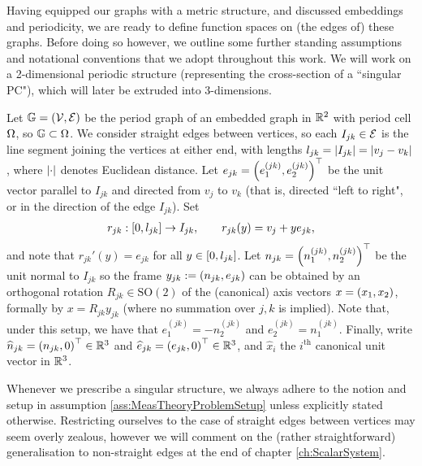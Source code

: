 Having equipped our graphs with a metric structure, and discussed embeddings and periodicity, we are ready to define function spaces on (the edges of) these graphs.
Before doing so however, we outline some further standing assumptions and notational conventions that we adopt throughout this work.
We will work on a 2-dimensional periodic structure (representing the cross-section of a ``singular PC"), which will later be extruded into 3-dimensions.
\begin{assumption} \label{ass:MeasTheoryProblemSetup}
	Let $\mathbb{G}=\left( \mathcal{V},\mathcal{E} \right)$ be the period graph of an embedded graph in $\mathbb{R}^2$ with period cell $\Omega$, so $\mathbb{G}\subset\Omega$.
	We consider straight edges between vertices, so each $I_{jk}\in \mathcal{E}$ is the line segment joining the vertices at either end, with lengths $l_{jk} = \left\lvert I_{jk} \right\rvert = \left\lvert v_j-v_k \right\rvert$, where $\left\lvert \cdot \right\rvert$ denotes Euclidean distance.
	Let $e_{jk} = \left( e_1^{(jk)}, e_2^{(jk)} \right)^\top$ be the unit vector parallel to $I_{jk}$ and directed from $v_j$ to $v_k$ (that is, directed ``left to right", or in the direction of the edge $I_{jk}$).
	Set
	\begin{align} \label{eq:EdgeParameterisation}
		r_{jk}:\left[ 0, l_{jk} \right] \rightarrow I_{jk},
		\qquad
		r_{jk}(y) = v_j + ye_{jk},
	\end{align}
	and note that $r_{jk}'(y) = e_{jk}$ for all $y\in\left[ 0, l_{jk} \right]$.
	Let $n_{jk} = \left( n_1^{(jk)}, n_2^{(jk)} \right)^\top$ be the unit normal to $I_{jk}$ so the frame $y_{jk} := \left( n_{jk}, e_{jk} \right)$ can be obtained by an orthogonal rotation $R_{jk}\in\mathrm{SO}(2)$ of the (canonical) axis vectors $x = \left( x_1, x_2 \right)$, formally by $x = R_{jk}y_{jk}$ (where no summation over $j,k$ is implied).
	Note that, under this setup, we have that $e_1^{(jk)} = - n_2^{(jk)}$ and $e_2^{(jk)} = n_1^{(jk)}$.
	Finally, write $\widehat{n}_{jk} = \left(  n_{jk}, 0  \right)^\top\in\mathbb{R}^3$ and $\widehat{e}_{jk} = \left(  e_{jk}, 0  \right)^\top\in\mathbb{R}^3$, and $\widehat{x}_i$ the $i^{\text{th}}$ canonical unit vector in $\mathbb{R}^3$.
\end{assumption}
Whenever we prescribe a singular structure, we always adhere to the notion and setup in assumption \ref{ass:MeasTheoryProblemSetup} unless explicitly stated otherwise.
Restricting ourselves to the case of straight edges between vertices may seem overly zealous, however we will comment on the (rather straightforward) generalisation to non-straight edges at the end of chapter \ref{ch:ScalarSystem}.

